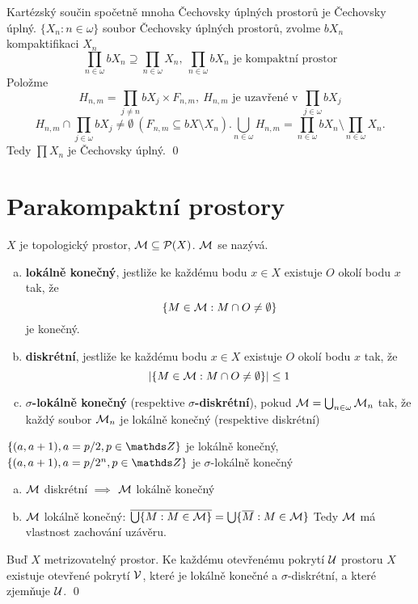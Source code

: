 \documentclass[12pt,a4paper]{article}
\newcommand\close{\overline}
\begin{document}
\veta Kartézský součin spočetně mnoha Čechovsky úplných prostorů je Čechovsky úplný.
\dukaz $\{ X_n : n \in \omega \}$ soubor Čechovsky úplných prostorů, zvolme
	$bX_n$ kompaktifikaci $X_n$
		$$\prod_{n \in \omega} bX_n \supseteq \prod_{n \in \omega}
		  X_n,~\prod_{n \in \omega} bX_n \text{ je kompaktní prostor}$$
	Položme
		$$H_{n,m} = \prod_{j \neq n} bX_j \times F_{n,m},~H_{n,m} \text{ je
		  uzavřené v } \prod_{j \in \omega} bX_j$$
		$$H_{n,m} \cap \prod_{j \in \omega} bX_j \neq \emptyset~(F_{n,m}
		  \subseteq bX \setminus X_n). \bigcup_{n \in \omega} H_{n,m} =
		  \prod_{n \in \omega} bX_n \setminus \prod_{n \in \omega} X_n.$$
	Tedy $\prod X_n$ je Čechovsky úplný.
	\qed

\section{Parakompaktní prostory}
 $X$ je topologický prostor, $\mathcal{ M } \subseteq \mathcal{ P }(X)$. $\mathcal{ M }$ se nazývá.
\begin{enumerate}[(a)]
	\item {\bf lokálně konečný}, jestliže ke každému bodu $x \in X$ existuje
	$O$ okolí bodu $x$ tak, že
		$$\{M \in \mathcal{ M } : M \cap O \neq \emptyset \}$$
	je konečný.

	\item {\bf diskrétní}, jestliže ke každému bodu $x \in X$ existuje $O$
	okolí bodu $x$ tak, že
		$$|\{ M \in \mathcal{ M } : M \cap O \neq \emptyset \}| \leq 1$$

	\item {\bf $\sigma$-lokálně konečný} (respektive {\bf $\sigma$-diskrétní}),
		pokud $\mathcal{ M } = \bigcup_{n \in \omega} \mathcal{ M }_n$ tak, že každý soubor $\mathcal{ M }_n$ je lokálně konečný (respektive diskrétní)
\end{enumerate}

\priklad $\{(a, a+1), a = p / 2, p \in \Z\}$ je lokálně konečný, $\{(a, a+1), a = p / 2^n, p \in \Z\}$ je $\sigma$-lokálně konečný

\poznamka
\begin{enumerate}[(a)]
	\item $\mathcal{ M }$ diskrétní $\implies$ $\mathcal{ M }$ lokálně konečný
	\item $\mathcal{ M }$ lokálně konečný: $\close{\bigcup \{M : M \in \p M\}} = \bigcup \{\close M : M \in \p M\}$ Tedy $\mathcal{ M }$ má vlastnost zachování uzávěru.
\end{enumerate}

\veta[A. H. Stone]
	Buď $X$ metrizovatelný prostor. Ke každému otevřenému pokrytí $\mathcal{ U }$
	prostoru $X$ existuje otevřené pokrytí $\mathcal{ V }$, které je lokálně konečné a
	$\sigma$-diskrétní, a které zjemňuje $\mathcal{ U }$.
\dukaz \qed
\end{document}
